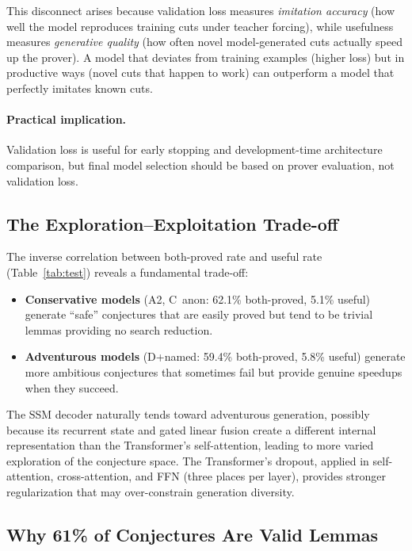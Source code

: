 \documentclass{article}
\begin{document}
This disconnect arises because validation loss measures \emph{imitation accuracy}
(how well the model reproduces training cuts under teacher forcing), while
usefulness measures \emph{generative quality} (how often novel model-generated
cuts actually speed up the prover). A model that deviates from training examples
(higher loss) but in productive ways (novel cuts that happen to work) can
outperform a model that perfectly imitates known cuts.

\paragraph{Practical implication.} Validation loss is useful for early stopping
and development-time architecture comparison, but final model selection should
be based on prover evaluation, not validation loss.

\subsection{The Exploration--Exploitation Trade-off}

The inverse correlation between both-proved rate and useful rate
(Table~\ref{tab:test}) reveals a fundamental trade-off:

\begin{itemize}
\item \textbf{Conservative models} (A2, C~anon: 62.1\% both-proved, 5.1\% useful)
      generate ``safe'' conjectures that are easily proved but tend to be trivial
      lemmas providing no search reduction.
\item \textbf{Adventurous models} (D+named: 59.4\% both-proved, 5.8\% useful)
      generate more ambitious conjectures that sometimes fail but provide genuine
      speedups when they succeed.
\end{itemize}

The SSM decoder naturally tends toward adventurous generation, possibly because
its recurrent state and gated linear fusion create a different internal
representation than the Transformer's self-attention, leading to more varied
exploration of the conjecture space. The Transformer's dropout, applied in
self-attention, cross-attention, and FFN (three places per layer), provides
stronger regularization that may over-constrain generation diversity.

\subsection{Why 61\% of Conjectures Are Valid Lemmas}
\end{document}
